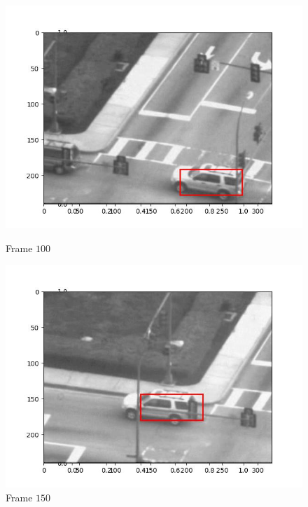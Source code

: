 \begin{figure}[H]
\begin{minipage}{.49\textwidth}
    \includegraphics[width=\textwidth]{./figures/lk/car2/frame000100.jpg}
    \caption{Frame $100$}
  \end{minipage}
  \begin{minipage}{.49\textwidth}
    \centering
    \includegraphics[width=\textwidth]{./figures/lk/car2/frame000150.jpg}
    \caption{Frame $150$}
  \end{minipage}
  \hfill
  \begin{minipage}{.49\textwidth}
    \centering

\end{minipage}
\end{figure}
